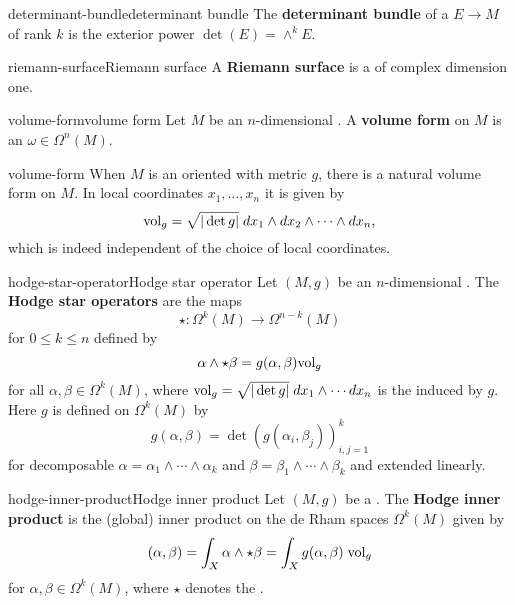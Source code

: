 \begin{topic}{determinant-bundle}{determinant bundle}
    The \textbf{determinant bundle} of a  $E \to M$ of rank $k$ is the exterior power $\det(E) = \wedge^k E$.
\end{topic}

\begin{topic}{riemann-surface}{Riemann surface}
    A \textbf{Riemann surface} is a   of complex dimension one.
\end{topic}

\begin{topic}{volume-form}{volume form}
    Let $M$ be an $n$-dimensional . A \textbf{volume form} on $M$ is an  $\omega \in \Omega^n(M)$.
\end{topic}

\begin{example}{volume-form}
    When $M$ is an oriented  with metric $g$, there is a natural volume form on $M$. In local coordinates $x_1, \ldots, x_n$ it is given by
    \[ \textup{vol}_g = \sqrt{|\det g|} \; dx_1 \wedge dx_2 \wedge \cdots \wedge dx_n , \]
    which is indeed independent of the choice of local coordinates.
\end{example}

\begin{topic}{hodge-star-operator}{Hodge star operator}
    Let $(M, g)$ be an $n$-dimensional . The \textbf{Hodge star operators} are the maps
    \[ \star \colon \Omega^k(M) \to \Omega^{n - k}(M) \]
    for $0 \le k \le n$ defined by
    \[ \alpha \wedge \star \beta = g(\alpha, \beta) \textup{vol}_g \]
    for all $\alpha, \beta \in \Omega^k(M)$, where $\textup{vol}_g = \sqrt{|\det g|} \; dx_1 \wedge \cdots dx_n$ is the  induced by $g$. Here $g$ is defined on $\Omega^k(M)$ by
    \[ g(\alpha, \beta) = \det\left(g(\alpha_i, \beta_j)\right)_{i, j = 1}^{k} \]
    for decomposable $\alpha = \alpha_1 \wedge \cdots \wedge \alpha_k$ and $\beta = \beta_1 \wedge \cdots \wedge \beta_k$ and extended linearly.
\end{topic}

\begin{topic}{hodge-inner-product}{Hodge inner product}
    Let $(M, g)$ be a . The \textbf{Hodge inner product} is the (global) inner product on the de Rham spaces $\Omega^k(M)$ given by
    \[ (\alpha, \beta) = \int_X \alpha \wedge \star \beta = \int_X g(\alpha, \beta) \; \textup{vol}_g \]
    for $\alpha, \beta \in \Omega^k(M)$, where $\star$ denotes the .
\end{topic}

